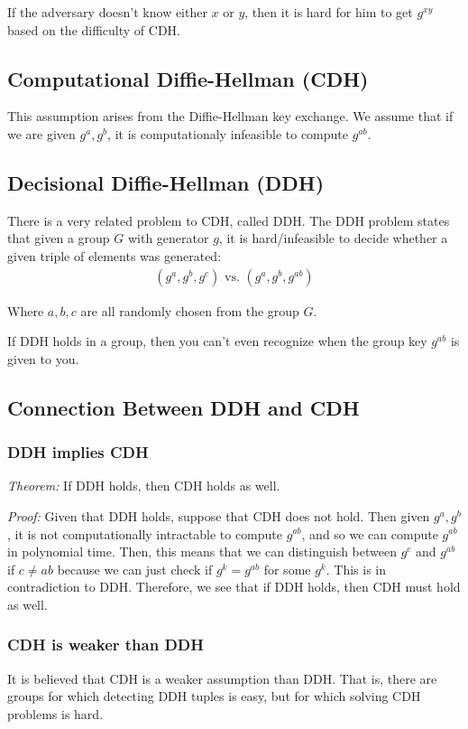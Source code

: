 \documentclass[psamsfonts]{amsart}
\begin{document}
If the adversary doesn't know either $x$ or $y$, then it is hard for him to get $g^{xy}$ based on the difficulty of CDH.

\subsection{Computational Diffie-Hellman (CDH)}

This assumption arises from the Diffie-Hellman key exchange. We assume that if we are given $g^a, g^b$, it is computationaly infeasible to compute $g^{ab}$.

\subsection{Decisional Diffie-Hellman (DDH)}

There is a very related problem to CDH, called DDH. The DDH problem states that given a group $G$ with generator $g$, it is hard/infeasible to decide whether a given triple of elements was generated:
\begin{eqnarray}
  (g^a, g^b, g^c) \textrm{ vs. } (g^a, g^b, g^{ab})
\end{eqnarray}

Where $a,b,c$ are all randomly chosen from the group $G$.

If DDH holds in a group, then you can't even recognize when the group key $g^{ab}$ is given to you.

\subsection{Connection Between DDH and CDH}

\subsubsection{DDH implies CDH}

\emph{Theorem:} If DDH holds, then CDH holds as well.

\emph{Proof:} Given that DDH holds, suppose that CDH does not hold. Then given $g^a, g^b$, it is not computationally intractable to compute $g^{ab}$, and so we can compute $g^{ab}$ in polynomial time. Then, this means that we can distinguish between $g^c$ and $g^{ab}$ if $c \neq ab$ because we can just check if $g^k = g^{ab}$ for some $g^k$. This is in contradiction to DDH. Therefore, we see that if DDH holds, then CDH must hold as well.

\subsubsection{CDH is weaker than DDH}

It is believed that CDH is a weaker assumption than DDH. That is, there are groups for which detecting DDH tuples is easy, but for which solving CDH problems is hard.
\end{document}

